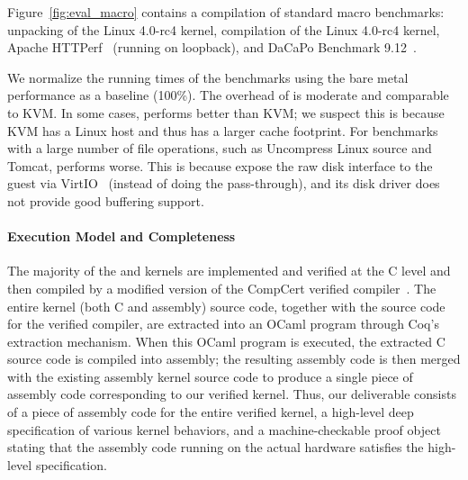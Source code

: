 
Figure~\ref{fig:eval_macro} contains a compilation of standard macro
benchmarks: unpacking of the Linux 4.0-rc4 kernel, compilation of the
Linux 4.0-rc4 kernel, Apache HTTPerf~\cite{mosberger1998} (running on
loopback), and DaCaPo Benchmark 9.12~\cite{dacapo2006}.
We normalize the running times of the benchmarks using the bare metal
performance as a baseline (100\%). The overhead of \cCTOS{} is
moderate and comparable to KVM. In some cases, \cCTOS{} performs
better than KVM; we suspect this is because KVM has a Linux host and
thus has a larger cache footprint.  For benchmarks with a large number
of file operations, such as Uncompress Linux source and Tomcat,
\cCTOS{} performs worse. This is because \cCTOS{} expose the raw disk
interface to the guest via VirtIO~\cite{russell08} (instead of doing
the pass-through), and its disk driver does not provide good buffering
support.









\paragraph{Execution Model and Completeness}
The majority of the {\cCTOS} and \cCTOS{} kernels are implemented and verified 
at the C level and then compiled by a modified version of the CompCert verified
compiler~\cite{dscal15}.  The entire kernel (both C and assembly)
source code, together with the source code for the verified compiler,
are extracted into an OCaml program through Coq's extraction
mechanism. When this OCaml program is executed, the extracted C source code 
is compiled into assembly; the resulting assembly code is then merged 
with the existing assembly kernel source code to produce a single piece 
of assembly code corresponding to our verified kernel.  Thus, our deliverable 
consists of a piece of assembly code for the entire verified kernel, a 
high-level deep specification of various kernel behaviors, and a 
machine-checkable proof object stating that the assembly code running on 
the actual hardware satisfies the high-level specification.

